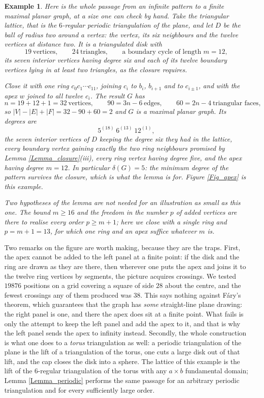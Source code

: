 \documentclass[12pt,a4paper]{article}%
\newtheorem{example}[theorem]{Example}
\begin{document}
\begin{example}
\label{Ex_apex}Here is the whole passage from an infinite pattern to a finite maximal planar graph, at a
size one can check by hand. Take the triangular lattice, that is the $6$-regular periodic triangulation of the
plane, and let $D$ be the ball of radius two around a vertex: the vertex, its six neighbours and the twelve
vertices at distance two. It is a triangulated disk with
\[
19\ \text{vertices},\qquad 24\ \text{triangles},\qquad \text{a boundary cycle of length }m=12,
\]
its seven interior vertices having degree six and each of its twelve boundary vertices lying in at least two
triangles, as the closure requires.

Close it with one ring $c_{0}c_{1}\cdots c_{11}$, joining $c_{i}$ to $b_{i}$, $b_{i+1}$ and to $c_{i\pm 1}$, and
with the apex $w$ joined to all twelve $c_{i}$. The result $G$ has
\[
n=19+12+1=32\ \text{vertices},\qquad 90=3n-6\ \text{edges},\qquad 60=2n-4\ \text{triangular faces},
\]
so $|V|-|E|+|F|=32-90+60=2$ and $G$ is a maximal planar graph. Its degrees are
\[
5^{(18)}\ 6^{(13)}\ 12^{(1)} ,
\]
the seven interior vertices of $D$ keeping the degree six they had in the lattice, every boundary vertex gaining
exactly the two ring neighbours promised by Lemma \ref{Lemma_closure}(iii), every ring vertex having degree
five, and the apex having degree $m=12$. In particular $\delta (G)=5$: the minimum degree of the pattern
survives the closure, which is what the lemma is for. Figure \ref{Fig_apex} is this example.

Two hypotheses of the lemma are not needed for an illustration as small as this one. The bound $m\geq 16$ and
the freedom in the number $p$ of added vertices are there to realise \emph{every} order $p\geq m+1$; here we
close with a single ring and $p=m+1=13$, for which one ring and an apex suffice whatever $m$ is.
\end{example}

Two remarks on the figure are worth making, because they are the traps. First, the apex cannot be added
to the left panel at a finite point: if the disk and the ring are drawn as they are there, then wherever one
puts the apex and joins it to the twelve ring vertices by segments, the picture acquires crossings. We tested
$19876$ positions on a grid covering a square of side $28$ about the centre, and the fewest crossings any of
them produced was $38$. This says nothing against F\'{a}ry's theorem, which guarantees that the graph has
\emph{some} straight-line plane drawing: the right panel is one, and there the apex does sit at a finite
point. What fails is only the attempt to keep the left panel and add the apex to it, and that is why the left
panel sends the apex to infinity instead. Secondly, the whole construction is what one does to a \emph{torus}
triangulation as well: a periodic triangulation of the plane is the lift of a triangulation of the torus, one
cuts a large disk out of that lift, and the cap closes the disk into a sphere. The lattice of this example is
the lift of the $6$-regular triangulation of the torus with any $a\times b$ fundamental domain; Lemma
\ref{Lemma_periodic} performs the same passage for an arbitrary periodic triangulation and for every
sufficiently large order.
\end{document}

